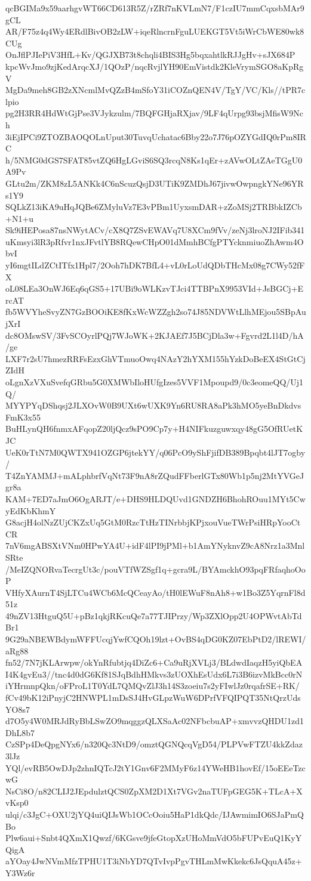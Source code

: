 qcBGIMa9x59aarhgvWT66CD613R5Z/rZRf7nKVLmN7/F1czIU7mmCqxsbMAr9gCL
AR/F75z4q4Wy4ERdlBivOB2zLW+iqeRlncrnFguLUEKGT5Vt5iWrCbWE80wk8CUg
OnJflPJIePiV3HfL+Kv/QGJXB73t8chqli4BIS3Hg5bqxahtlkRJJgHv+sJX684P
kpcWvJmo9zjKedArqcXJ/1QOzP/nqcRvjlYH90EmVistdk2KleVrymSGO8aKpRgV
MgDa9meh8GB2zXNcmlMvQZzB4mSfoY31iCOZnQEN4V/TgY/VC/Kls//tPR7clpio
pg2H3RR4HdWtGjPse3VJykzulm/7BQFGHjaRXjav/9LF4qUrpg93bsjMfisW9Nch
3iEjIPCi9ZTOZBAOQOLnUput30TuvqUchatac6Bby22o7J76pOZYGdIQ0rPm8IRC
h/5NMG0dGS7SFAT85vtZQ6HgLGviS6SQ3rcqN8Ks1qEr+zAVwOLtZAeTGgU0A9Pv
GLtu2m/ZKM8zL5ANKk4C6nScuzQsjD3UTiK9ZMDhJ67jivwOwpngkYNe96YRs1Y9
SQLkZ13iKA9uHqJQBe6ZMyluVz7E3vPBm1UyxsmDAR+zZoMSj2TRBbkIZCb+N1+u
Sk9iHEPosa87nsNWytACv/cX8Q7ZSvEWAVq7U8XCm9fVv/zeNj3lroNJ2IFib341
uKmsyi3lR3pRfvr1nxJFvtlYB8RQewCHpO01dMmhBCfgPTYcknmiuoZhAwm4ObvI
yI6mgtILdZCtITfx1Hpl7/2Ooh7hDK7BfL4+vL0rLoUdQDbTHcMx08g7CWy52fFX
oL08LEa3OnWJ6Eq6qGS5+17UBi9oWLKzvTJci4TTBPnX9953VId+JsBGCj+ErcAT
fb5WVYheSvyZN7GzBOOiKE8fKxWcWZZgh2so74J85NDVWtLlhMEjou5SBpAujXrI
dc8OMswSV/3FvSCOyrlPQj7WJoWK+2KJAEf7J5BCjDla3w+Fgvrd2L1l4D/hA/ge
LXF7r2sU7hmezRRFsEzxGhVTmuoOwq4NAzY2hYXM155hYzkDoBeEX4StGtCjZIdH
oLgnXzVXuSvefqGRbu5G0XMWbIloHUfgIzes5VVF1Mpoupd9/0c3eomeQQ/Uj1Q/
MYYPYqDShqsj2JLXOvW0B9UXt6wUXK9Yn6RU8RA8aPk3hMO5yeBnDkdvsFmK3x55
BuHLynQH6fnmxAFqopZ20ljQcz9sPO9Cp7y+H4NIFkuzguwxqy48gG5OfRUetKJC
UeK0rTtN7M0QWTX941OZGP6jtekYY/q06PcO9yShFjifDB389Bpqbt4lJT7ogby/
T4ZnYAMMJ+mALphbrfVqNt73F9nA8rZQudFFberlGTx80Wb1p5nj2MtYVGeJgr8a
KAM+7ED7aJmO6OgARJT/e+DHS9HLDQUvd1GNDZH6BhohROuu1MYt5CwyEdKbKhmY
G8acjH4olNzZUjCKZxUq5GtM0RzcTtHzTINrbbjKPjxouVueTWrPsiHRpYooCtCR
7nV6mgABSXtVNm0HPwYA4U+idF4lPI9jPMl+b1AmYNyknvZ9cA8Nrz1a3MnlSRte
/MeIZQNORvaTecrgUt3c/pouVTfWZSgf1q+gcra9L/BYAmckhO93pqFRfaqhoOoP
VHfyXAurnT4SjLTCu4WCb6McQCeayAo/tH0lEWuF8nAh8+w1Bo3Z5YqrnFl8d51z
49nZV13HtguQ5U+pBz1qkjRKcuQe7a77TJIPrzy/Wp3ZXlOpp2U4OPWvtAbTdBr1
9G29aNBEWBdymWFFUcqjYwfCQOh19lzt+OvBS4qDG0KZ07EbPtD2/lREWI/aRg88
fn52/7N7jKLArwpw/okYnRfubtjq4DiZc6+Ca9uRjXVLj3/BLdwdIaqzH5yiQbEA
I4K4gvEu3//tnc4d0dG6Kf81SJqBdhHMkvs3zUOXhEsUdx6L7i3B6izvMkBcc0rN
iYHrmnpQkn/oFProL1T0YdL7QMQvZlJ3h14S3zoeiu7s2yFIwlJz0rqafrSE+RK/
fCv49bK12iPnyjC2HNWPL1mDsSJ4HvGLpzWuW6DPrfVFQIPQT35NtQrzUdsYO8s7
d7O5y4W0MRJdRyBbLSwZO9mqggzQLXSaAc02NFbcbuAP+xmvvzQHDU1zd1DhL8b7
CzSPp4DeQpgNYx6/n320Qc3NtD9/omztQGNQcqVgD54/PLPVwFTZU4kkZdaz3lJz
YQl/evRB5OwDJp2zhnIQTcJ2tY1Gnv6F2MMyF6z14YWeHB1hovEf/15oEEeTzcwG
NsCi8O/n82CLIJ2JEpdulztQCS0ZpXM2D1Xt7VGv2naTUFpGEG5K+TLcA+XvKsp0
ulqi/c3JgC+OXU2jYQ4uiQIJsWb1OCcOoiu5HaP1dkQdc/IJAwmimIO6SJaPmQBo
Plw6aui+Snbt4QXmX1Qwzf/6KGsve9jfeGtopXzUHoMmVdO5bFUPvEuQ1KyYQigA
aYOay4JwNVmMfzTPHU1T3iNbYD7QTvIvpPgvTHLmMwKkekc6JsQquA45z+Y3Wz6r

